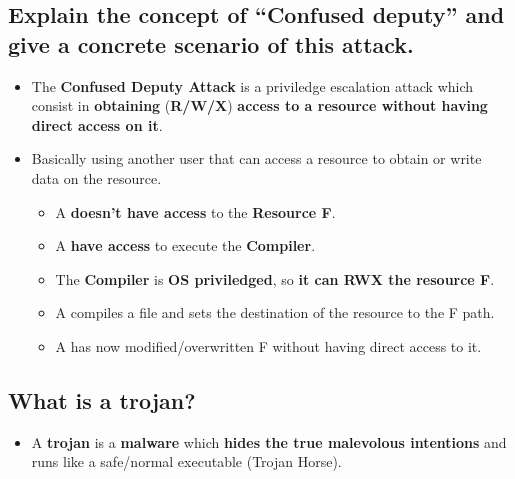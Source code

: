 \documentclass[9pt, letterpaper]{article}
\begin{document}
\subsection{Explain the concept of “Confused deputy” and give a concrete scenario of this attack.}
\begin{itemize}
	\item The \textbf{Confused Deputy Attack} is a priviledge escalation attack which consist in \textbf{obtaining} (\textbf{R/W/X}) \textbf{access to a resource without having direct access on it}.
	\item Basically using another user that can access a resource to obtain or write data on the resource.
	      \begin{itemize}
		      \item A \textbf{doesn't have access} to the \textbf{Resource F}.
		      \item A \textbf{have access} to execute the \textbf{Compiler}.
		      \item The \textbf{Compiler} is \textbf{OS priviledged}, so \textbf{it can RWX the resource F}.
		      \item A compiles a file and sets the destination of the resource to the F path.
		      \item A has now modified/overwritten F without having direct access to it.
	      \end{itemize}
\end{itemize}

\subsection{What is a trojan?}
\begin{itemize}
	\item A \textbf{trojan} is a \textbf{malware} which \textbf{hides the true malevolous intentions} and runs like a safe/normal executable (Trojan Horse).
\end{itemize}
\end{document}
